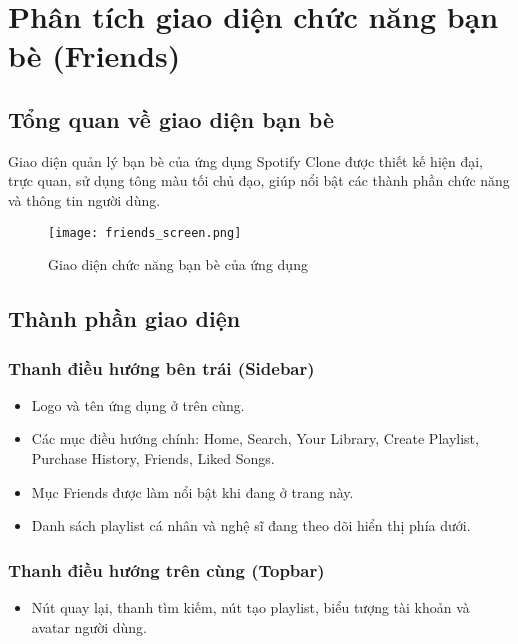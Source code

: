 \documentclass{book}
\let\oldsection\section
\renewcommand{\section}{\clearpage\oldsection}
\begin{document}
\section{Phân tích giao diện chức năng bạn bè (Friends)}

\subsection{Tổng quan về giao diện bạn bè}
Giao diện quản lý bạn bè của ứng dụng Spotify Clone được thiết kế hiện đại, trực quan, sử dụng tông màu tối chủ đạo, giúp nổi bật các thành phần chức năng và thông tin người dùng.

\begin{figure}[h!]
\centering
\texttt{[image: friends\_screen.png]} %
\caption{Giao diện chức năng bạn bè của ứng dụng}
\label{fig:friends}
\end{figure}

\subsection{Thành phần giao diện}

\subsubsection{Thanh điều hướng bên trái (Sidebar)}
\begin{itemize}
    \item Logo và tên ứng dụng ở trên cùng.
    \item Các mục điều hướng chính: Home, Search, Your Library, Create Playlist, Purchase History, Friends, Liked Songs.
    \item Mục Friends được làm nổi bật khi đang ở trang này.
    \item Danh sách playlist cá nhân và nghệ sĩ đang theo dõi hiển thị phía dưới.
\end{itemize}

\subsubsection{Thanh điều hướng trên cùng (Topbar)}
\begin{itemize}
    \item Nút quay lại, thanh tìm kiếm, nút tạo playlist, biểu tượng tài khoản và avatar người dùng.
\end{itemize}
\end{document}
